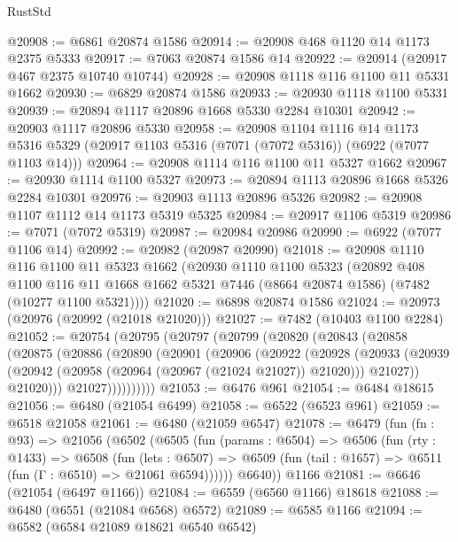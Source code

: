 \begin{lexlean}{RustStd}
\begin{coremodule}
@20908 := @6861 @20874 @1586
@20914 := @20908 @468 @1120 @14 @1173 @2375 @5333
@20917 := @7063 @20874 @1586 @14
@20922 := @20914 (@20917 @467 @2375 @10740 @10744)
@20928 := @20908 @1118 @116 @1100 @11 @5331 @1662
@20930 := @6829 @20874 @1586
@20933 := @20930 @1118 @1100 @5331
@20939 := @20894 @1117 @20896 @1668 @5330 @2284 @10301
@20942 := @20903 @1117 @20896 @5330
@20958 := @20908
    @1104
    @1116
    @14
    @1173
    @5316
    @5329
    (@20917 @1103 @5316 (@7071 (@7072 @5316)) (@6922 (@7077 @1103 @14)))
@20964 := @20908 @1114 @116 @1100 @11 @5327 @1662
@20967 := @20930 @1114 @1100 @5327
@20973 := @20894 @1113 @20896 @1668 @5326 @2284 @10301
@20976 := @20903 @1113 @20896 @5326
@20982 := @20908 @1107 @1112 @14 @1173 @5319 @5325
@20984 := @20917 @1106 @5319
@20986 := @7071 (@7072 @5319)
@20987 := @20984 @20986
@20990 := @6922 (@7077 @1106 @14)
@20992 := @20982 (@20987 @20990)
@21018 := @20908
    @1110
    @116
    @1100
    @11
    @5323
    @1662
    (@20930
      @1110
      @1100
      @5323
      (@20892
        @408
        @1100
        @116
        @11
        @1668
        @1662
        @5321
        @7446
        (@8664 @20874 @1586)
        (@7482 (@10277 @1100 @5321))))
@21020 := @6898 @20874 @1586
@21024 := @20973 (@20976 (@20992 (@21018 @21020)))
@21027 := @7482 (@10403 @1100 @2284)
@21052 := @20754
    (@20795
      (@20797
        (@20799
          (@20820
            (@20843
              (@20858
                (@20875
                  (@20886
                    (@20890
                      (@20901
                        (@20906
                          (@20922
                            (@20928
                              (@20933
                                (@20939
                                  (@20942 (@20958 (@20964 (@20967 (@21024 @21027)) @21020)))
                                  @21027))
                              @21020)))
                        @21027))))))))))
@21053 := @6476 @961
@21054 := @6484 @18615
@21056 := @6480 (@21054 @6499)
@21058 := @6522 (@6523 @961)
@21059 := @6518 @21058
@21061 := @6480 (@21059 @6547)
@21078 := @6479
    (fun (fn : @93) =>
    @21056
      (@6502
        (@6505
          (fun (params : @6504) =>
          @6506
            (fun (rty : @1433) =>
            @6508
              (fun (lets : @6507) =>
              @6509 (fun (tail : @1657) => @6511 (fun (Γ : @6510) => @21061 @6594))))))
        @6640))
    @1166
@21081 := @6646 (@21054 (@6497 @1166))
@21084 := @6559 (@6560 @1166) @18618
@21088 := @6480 (@6551 (@21084 @6568) @6572)
@21089 := @6585 @1166
@21094 := @6582 (@6584 @21089 @18621 @6540 @6542)

\end{coremodule}
\end{lexlean}
